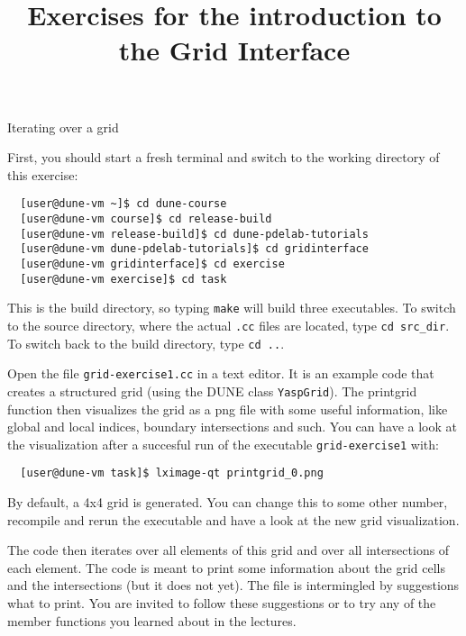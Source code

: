 \documentclass[12pt,a4paper]{article}
\title{\textbf{Exercises for the introduction to the Grid Interface}}
\begin{document}
\exerciseheader

\begin{Exercise}{Iterating over a grid}

First, you should start a fresh terminal and switch to the working directory of this exercise:
\begin{lstlisting}
  [user@dune-vm ~]$ cd dune-course
  [user@dune-vm course]$ cd release-build
  [user@dune-vm release-build]$ cd dune-pdelab-tutorials
  [user@dune-vm dune-pdelab-tutorials]$ cd gridinterface
  [user@dune-vm gridinterface]$ cd exercise
  [user@dune-vm exercise]$ cd task
\end{lstlisting}

This is the build directory, so typing \lstinline!make! will build three executables.
To switch to the source directory, where the actual \lstinline!.cc! files are located, type \lstinline!cd src_dir!.
To switch back to the build directory, type \lstinline!cd ..!.

Open the file \texttt{grid-exercise1.cc} in a text editor.  It is an
example code that creates a structured grid (using the DUNE class
\texttt{YaspGrid}). The printgrid function then visualizes the grid
as a png file with some useful information, like global and local
indices, boundary intersections and such. You can have a look at the
visualization after a succesful run of the executable \lstinline!grid-exercise1!
with:

\begin{lstlisting}
  [user@dune-vm task]$ lximage-qt printgrid_0.png
\end{lstlisting}%

By default, a 4x4 grid is generated. You can change this to some
other number, recompile and rerun the executable and have a look at
the new grid visualization.

The code then iterates over all elements of this grid and
over all intersections of each element.  The code is meant to print
some information about the grid cells and the intersections (but it
does not yet).  The file is intermingled by suggestions what to print.
You are invited to follow these suggestions or to try any of the
member functions you learned about in the lectures.

\begin{center}
\end{center}
\end{Exercise}
\end{document}
